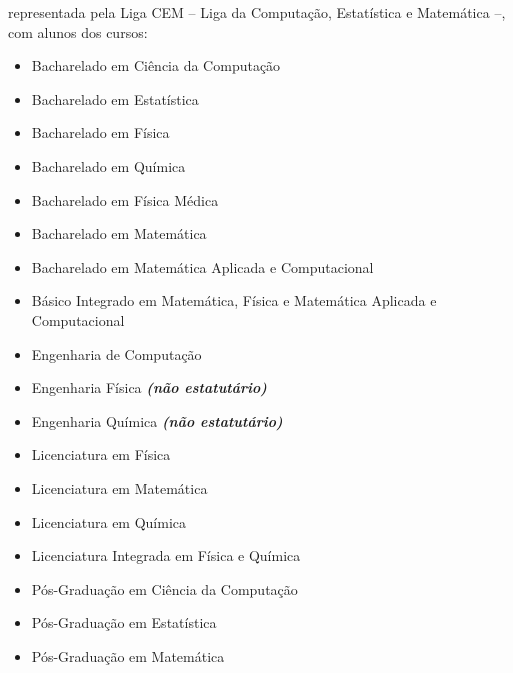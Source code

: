 \begin{article}
\begin{description}[noitemsep]
		\item[UNICAMP - Campinas] representada pela Liga CEM -- Liga da Computação, Estatística e Matemática --, com alunos dos cursos:
		\begin{itemize}[noitemsep]
			\item Bacharelado em Ciência da Computação
			\item Bacharelado em Estatística
			\item Bacharelado em Física
			\item Bacharelado em Química
			\item Bacharelado em Física Médica
			\item Bacharelado em Matemática
			\item Bacharelado em Matemática Aplicada e Computacional
			\item Básico Integrado em Matemática, Física e Matemática Aplicada e Computacional
			\item Engenharia de Computação
			\item Engenharia Física \textbf{\textit{(não estatutário)}}
			\item Engenharia Química \textbf{\textit{(não estatutário)}}
			\item Licenciatura em Física
			\item Licenciatura em Matemática
			\item Licenciatura em Química
			\item Licenciatura Integrada em Física e Química
			\item Pós-Graduação em Ciência da Computação
			\item Pós-Graduação em Estatística
			\item Pós-Graduação em Matemática
		\end{itemize}


\end{description}
\end{article}

